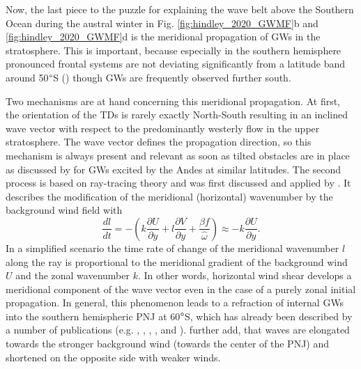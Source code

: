 %
Now, the last piece to the puzzle for explaining the wave belt above the Southern Ocean during the austral winter in Fig. \ref{fig:hindley_2020_GWMF}b and \ref{fig:hindley_2020_GWMF}d is the meridional propagation of GWs in the stratosphere. This is important, because especially in the southern hemisphere pronounced frontal systems are not deviating significantly from a latitude band around 50$\degree$S (\cite{skerlak_tropopause_2015}) though GWs are frequently observed further south.

Two mechanisms are at hand concerning this meridional propagation. At first, the orientation of the TDs is rarely exactly North-South resulting in an inclined wave vector with respect to the predominantly westerly flow in the upper stratosphere. The wave vector defines the propagation direction, so this mechanism is always present and relevant as soon as tilted obstacles are in place as discussed by \textcite{preusse_space-based_2002} for GWs excited by the Andes at similar latitudes. The second process is based on ray-tracing theory and was first discussed and applied by \textcite{dunkerton_inertiagravity_1984}. It describes the modification of the meridional (horizontal) wavenumber by the background wind field with
%
\begin{equation}
    \frac{dl}{dt} = -(k \frac{\partial U}{\partial y} + l \frac{\partial V}{\partial y} + \frac{\beta f}{\hat{\omega}})
    \approx -k \frac{\partial U}{\partial y}.
    \label{equ:meridionalRefraction}
\end{equation}
%
In a simplified scenario the time rate of change of the meridional wavenumber $l$ along the ray is proportional to the meridional gradient of the background wind $U$ and the zonal wavenumber $k$. In other words, horizontal wind shear develops a meridional component of the wave vector even in the case of a purely zonal initial propagation. In general, this phenomenon leads to a refraction of internal GWs into the southern hemispheric PNJ at 60$\degree$S, which has already been described by a number of publications (e.g. \cite{dunkerton_inertiagravity_1984}, \cite{preusse_space-based_2002}, \cite{sato_origins_2009}, \cite{sato_gravity_2012}, \cite{ehard_horizontal_2017} and \cite{jiang_stratospheric_2019}). \textcite{jiang_stratospheric_2019} further add, that waves are elongated towards the stronger background wind (towards the center of the PNJ) and shortened on the opposite side with weaker winds.

